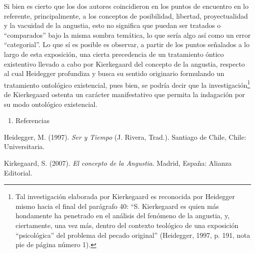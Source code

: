 \documentclass[]{article}
\begin{document}
Si bien es cierto que los dos autores coincidieron en los puntos de encuentro en lo referente, principalmente, a los conceptos de posibilidad, libertad, proyectualidad y la vacuidad de la angustia, esto no significa que puedan ser tratados o ``comparados'' bajo la misma sombra temática, lo que sería algo así como un error ``categorial''. Lo que sí es posible es observar, a partir de los puntos señalados a lo largo de esta exposición, una cierta precedencia de un tratamiento óntico existentivo llevado a cabo por Kierkegaard del concepto de la angustia, respecto al cual Heidegger profundiza y busca su sentido originario formulando un tratamiento ontológico existencial, pues bien, se podría decir que la investigación\footnote{Tal investigación elaborada por Kierkegaard es reconocida por Heidegger mismo hacia el final del parágrafo 40: ``S. Kierkegaard es quien más hondamente ha penetrado en el análisis del fenómeno de la angustia, y, ciertamente, una vez más, dentro del contexto teológico de una exposición ``psicológica'' del problema del pecado original'' (Heidegger, 1997, p. 191, nota pie de página número 1).} de Kierkegaard ostenta un carácter manifestativo que permita la indagación por su modo ontológico existencial.

\begin{enumerate}
\item
  Referencias
\end{enumerate}

Heidegger, M. (1997). \emph{Ser y Tiempo} (J. Rivera, Trad.). Santiago de Chile, Chile: Universitaria.

Kirkegaard, S. (2007). \emph{El concepto de la Angustia}. Madrid, España: Alianza Editorial.
\end{document}
